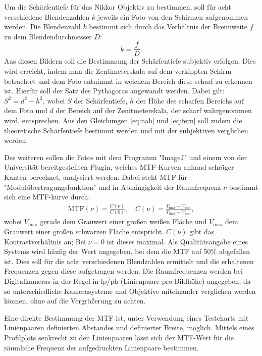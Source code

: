 		Um die Schärfentiefe für das Nikkor Objektiv zu bestimmen, soll für acht verschiedene Blendenzahlen $k$ jeweils ein Foto von den Schirmen aufgenommen werden.
		Die Blendenzahl $k$ bestimmt sich durch das Verhältnis der Brennweite $f$ zu dem Blendendurchmesser $D$: 
		\begin{equation}
			k = \frac{f}{D}.
		\end{equation}
		Aus diesen Bildern soll die Bestimmung der Schärfentiefe subjektiv erfolgen.
		Dies wird erreicht, indem man die Zentimeterskala auf dem verkippten Schirm betrachtet und dem Foto entnimmt in welchem Bereich diese scharf zu erkennen ist.
		Hierfür soll der Satz des Pythagoras angewandt werden.
		Dabei gilt: $S^2 = d^2 - h^2$, wobei $S$ der Schärfentiefe, $h$ der Höhe des scharfen Bereichs auf dem Foto und $d$ der Bereich auf der Zenitmeterskala, der scharf wahrgenommen wird, entsprechen.
		Aus den Gleichungen \ref{eq:nah} und \ref{eq:fern} soll zudem die theoretische Schärfentiefe bestimmt werden und mit der subjektiven verglichen werden.
		
		Des weiteren sollen die Fotos mit dem Programm "ImageJ" und einem von der Universität bereitgestellten Plugin, welches MTF-Kurven anhand schräger Kanten berechnet, analysiert werden.
		Dabei steht MTF für "Modulübertragungsfunktion" und in Abhängigkeit der Raumfrequenz $\nu$ bestimmt sich eine MTF-kurve durch:
		\begin{align}
			\text{MTF}(\nu) = \frac{C(\nu)}{C(0)}, \quad C(\nu) = \frac{V_\text{max}-V_\text{min}}{V_\text{max}+V_\text{min}},
		\end{align}
		wobei $V_\text{max}$ gerade dem Grauwert einer großen weißen Fläche und $V_\text{max}$ dem Grauwert einer großen schwarzen Fläche entspricht.
		$C(\nu)$ gibt das Kontrastverhältnis an; Bei $\nu = 0$ ist dieses maximal.
		Als Qualitätsangabe eines Systems wird häufig der Wert angegeben, bei dem die MTF auf 50\% abgefallen ist.
		Dies soll für die acht verschiedenen Blendzahlen ermittelt und die erhaltenen Frequenzen gegen diese aufgetragen werden.
		Die Raumfrequenzen werden bei Digitalkameras in der Regel in lp/ph (Linienpaare pro Bildhöhe) angegeben, da so unterschiedliche Kamerasysteme und Objektive miteinander verglichen werden können, ohne auf die Vergrößerung zu achten.
		
		Eine direkte Bestimmung der MTF ist, unter Verwendung eines Testcharts mit Linienpaaren definierten Abstandes und definierter Breite, möglich.
		Mittels eines Profilplots senkrecht zu den Linienpaaren lässt sich der MTF-Wert für die räumliche Frequenz der aufgedruckten Linienpaare bestimmen.
		
